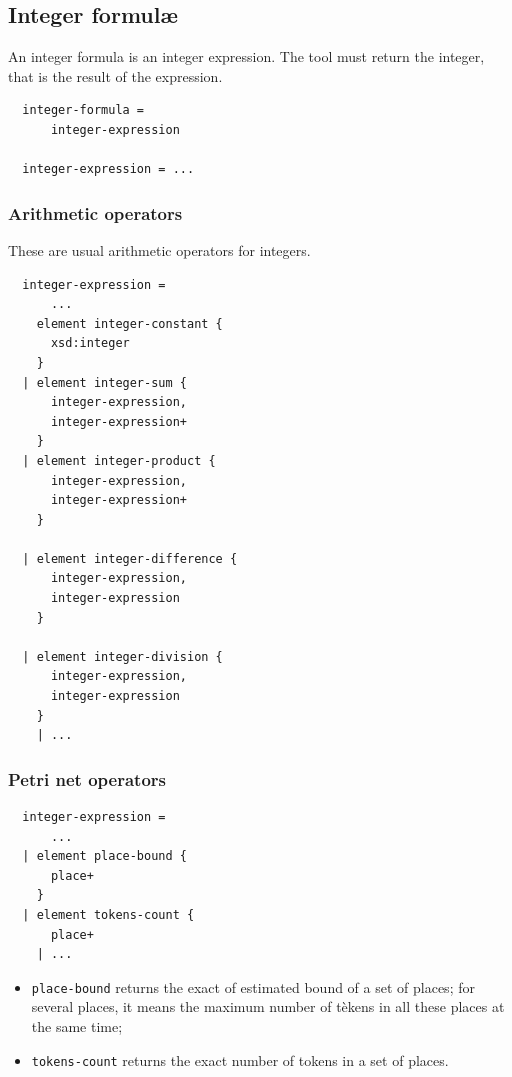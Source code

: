 \documentclass[10pt,english,a4paper]{article}
\begin{document}
\subsection{Integer formul{\ae}}

An integer formula is an integer expression.
The tool must return the integer, that is the result of the expression.

\begin{lstlisting}
  integer-formula =
      integer-expression

  integer-expression = ...
\end{lstlisting}

\subsubsection{Arithmetic operators}

These are usual arithmetic operators for integers.

\begin{lstlisting}
  integer-expression =
      ...
    element integer-constant {
      xsd:integer
    }
  | element integer-sum {
      integer-expression,
      integer-expression+
    }
  | element integer-product {
      integer-expression,
      integer-expression+
    }

  | element integer-difference {
      integer-expression,
      integer-expression
    }

  | element integer-division {
      integer-expression,
      integer-expression
    }
    | ...
\end{lstlisting}

\subsubsection{Petri net operators}

\begin{lstlisting}
  integer-expression =
      ...
  | element place-bound {
      place+
    }
  | element tokens-count {
      place+
    | ...
\end{lstlisting}

\begin{itemize}
  \item \lstinline!place-bound! returns the exact of estimated bound of a set of places;
    for several places, it means the maximum number of tèkens in all these places at the same
    time;
  \item \lstinline!tokens-count! returns the exact number of tokens in a set of places.
\end{itemize}
\end{document}
